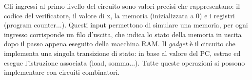 


Gli ingressi al primo livello del circuito sono valori precisi che rappresentano: il codice del verificatore, il valore di x, la memoria (inizializzata a 0) e i registri (program counter...). Questi input permettono di simulare una memoria, per ogni ingresso corrisponde un filo d'uscita, che indica lo stato della memoria in uscita dopo il passo appena eseguito della macchina RAM. Il \emph{gadget} è il circuito che implementa una singola transizione di stato: in base al valore del PC, estrae ed esegue l'istruzione associata (load, somma...). Tutte queste operazioni si possono implementare con circuiti combinatori.

